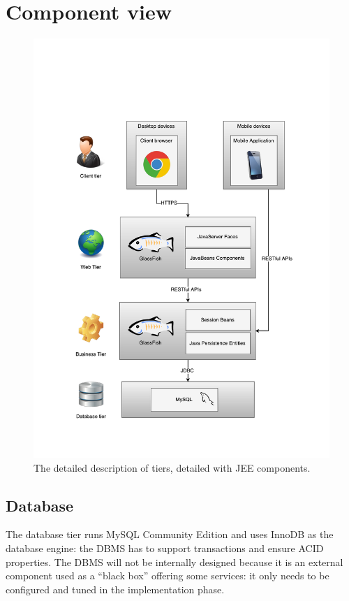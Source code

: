 \section{Component view}
\label{sec:component-view}

\begin{figure}
\centering
\includegraphics[width=\textwidth]{diagrams/JEE_Tiers}
\caption{The detailed description of tiers, detailed with JEE components.}
\label{fig:tiers-jee}
\end{figure}

\subsection{Database}
\label{sec:component-database}
The database tier runs MySQL Community Edition and uses InnoDB as the database engine: the DBMS has to support transactions and ensure ACID properties.
The DBMS will not be internally designed because it is an external component used as a ``black box'' offering some services: it only needs to be configured and tuned in the implementation phase.

